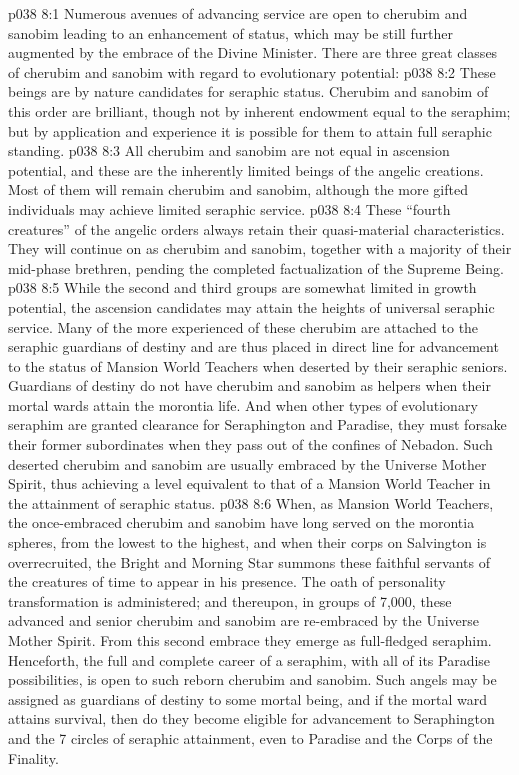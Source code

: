 \vs p038 8:1 Numerous avenues of advancing service are open to cherubim and sanobim leading to an enhancement of status, which may be still further augmented by the embrace of the Divine Minister. There are three great classes of cherubim and sanobim with regard to evolutionary potential:
\vs p038 8:2 \bibnobreakspace {} These beings are by nature candidates for seraphic status. Cherubim and sanobim of this order are brilliant, though not by inherent endowment equal to the seraphim; but by application and experience it is possible for them to attain full seraphic standing.
\vs p038 8:3 \bibnobreakspace {} All cherubim and sanobim are not equal in ascension potential, and these are the inherently limited beings of the angelic creations. Most of them will remain cherubim and sanobim, although the more gifted individuals may achieve limited seraphic service.
\vs p038 8:4 \bibnobreakspace {} These “fourth creatures” of the angelic orders always retain their quasi\hyp{}material characteristics. They will continue on as cherubim and sanobim, together with a majority of their mid\hyp{}phase brethren, pending the completed factualization of the Supreme Being.
\vs p038 8:5 \pc While the second and third groups are somewhat limited in growth potential, the ascension candidates may attain the heights of universal seraphic service. Many of the more experienced of these cherubim are attached to the seraphic guardians of destiny and are thus placed in direct line for advancement to the status of Mansion World Teachers when deserted by their seraphic seniors. Guardians of destiny do not have cherubim and sanobim as helpers when their mortal wards attain the morontia life. And when other types of evolutionary seraphim are granted clearance for Seraphington and Paradise, they must forsake their former subordinates when they pass out of the confines of Nebadon. Such deserted cherubim and sanobim are usually embraced by the Universe Mother Spirit, thus achieving a level equivalent to that of a Mansion World Teacher in the attainment of seraphic status.
\vs p038 8:6 When, as Mansion World Teachers, the once\hyp{}embraced cherubim and sanobim have long served on the morontia spheres, from the lowest to the highest, and when their corps on Salvington is overrecruited, the Bright and Morning Star summons these faithful servants of the creatures of time to appear in his presence. The oath of personality transformation is administered; and thereupon, in groups of 7,000, these advanced and senior cherubim and sanobim are re\hyp{}embraced by the Universe Mother Spirit. From this second embrace they emerge as full\hyp{}fledged seraphim. Henceforth, the full and complete career of a seraphim, with all of its Paradise possibilities, is open to such reborn cherubim and sanobim. Such angels may be assigned as guardians of destiny to some mortal being, and if the mortal ward attains survival, then do they become eligible for advancement to Seraphington and the 7 circles of seraphic attainment, even to Paradise and the Corps of the Finality.
